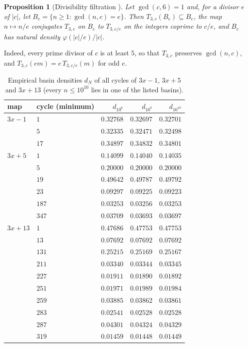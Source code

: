 \documentclass[12pt]{amsart}
\newtheorem{proposition}{Proposition}
\theoremstyle{definition}
\theoremstyle{remark}
\begin{document}
\begin{proposition}[Divisibility filtration \cite{Lagarias_1990,Belaga_Mignotte_DMTCS_2006,Wegner_2021}]
\label{prop:filtration}
Let $\gcd(c,6)=1$ and, for a divisor $e$ of $|c|$, let $B_e=\{n\ge1:\gcd(n,c)=e\}$. Then $T_{3,c}(B_e)\subseteq B_e$, the map $n\mapsto n/e$ conjugates $T_{3,c}$ on $B_e$ to $T_{3,c/e}$ on the integers coprime to $c/e$, and $B_e$ has natural density $\varphi(|c|/e)/|c|$.
\end{proposition}

Indeed, every prime divisor of $c$ is at least $5$, so that $T_{3,c}$ preserves $\gcd(n,c)$, and $T_{3,c}(em)=e\,T_{3,c/e}(m)$ for odd $e$.

\begin{table}[htbp]
\centering
\small
\begin{tabular}{llrrr}
\toprule
map & cycle (minimum) & $d_{10^6}$ & $d_{10^8}$ & $d_{10^{10}}$ \\
\midrule
$3x-1$ & $1$ & $0.32768$ & $0.32697$ & $0.32701$ \\
 & $5$ & $0.32335$ & $0.32471$ & $0.32498$ \\
 & $17$ & $0.34897$ & $0.34832$ & $0.34801$ \\
\midrule
$3x+5$ & $1$ & $0.14099$ & $0.14040$ & $0.14035$ \\
 & $5$ & $0.20000$ & $0.20000$ & $0.20000$ \\
 & $19$ & $0.49642$ & $0.49787$ & $0.49792$ \\
 & $23$ & $0.09297$ & $0.09225$ & $0.09223$ \\
 & $187$ & $0.03253$ & $0.03256$ & $0.03253$ \\
 & $347$ & $0.03709$ & $0.03693$ & $0.03697$ \\
\midrule
$3x+13$ & $1$ & $0.47686$ & $0.47753$ & $0.47753$ \\
 & $13$ & $0.07692$ & $0.07692$ & $0.07692$ \\
 & $131$ & $0.25215$ & $0.25169$ & $0.25167$ \\
 & $211$ & $0.03340$ & $0.03344$ & $0.03345$ \\
 & $227$ & $0.01911$ & $0.01890$ & $0.01892$ \\
 & $251$ & $0.01971$ & $0.01989$ & $0.01984$ \\
 & $259$ & $0.03885$ & $0.03862$ & $0.03861$ \\
 & $283$ & $0.02541$ & $0.02528$ & $0.02528$ \\
 & $287$ & $0.04301$ & $0.04324$ & $0.04329$ \\
 & $319$ & $0.01459$ & $0.01448$ & $0.01449$ \\
\bottomrule
\end{tabular}
\caption{Empirical basin densities $d_N$ of all cycles of $3x-1$, $3x+5$ and $3x+13$ (every $n\le10^{10}$ lies in one of the listed basins).}
\label{table:basins}
\end{table}
\end{document}
